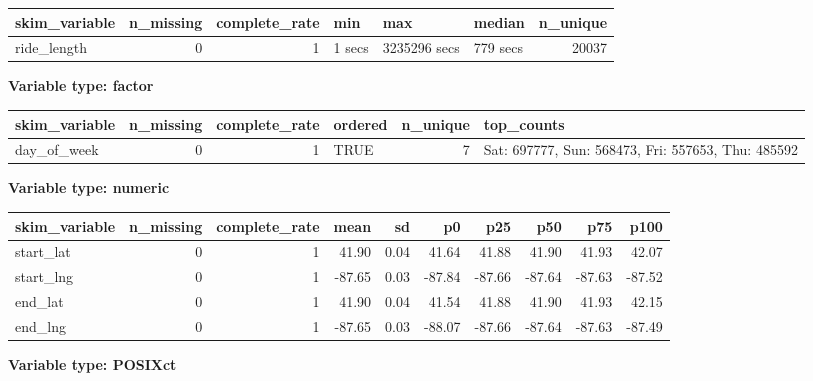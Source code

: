 \documentclass[
]{article}
\begin{document}
\begin{longtable}[]{@{}lrrlllr@{}}
\toprule
skim\_variable & n\_missing & complete\_rate & min & max & median &
n\_unique \\
\midrule
\endhead
ride\_length & 0 & 1 & 1 secs & 3235296 secs & 779 secs & 20037 \\
\bottomrule
\end{longtable}

\textbf{Variable type: factor}

\begin{longtable}[]{@{}lrrlrl@{}}
\toprule
skim\_variable & n\_missing & complete\_rate & ordered & n\_unique &
top\_counts \\
\midrule
\endhead
day\_of\_week & 0 & 1 & TRUE & 7 & Sat: 697777, Sun: 568473, Fri:
557653, Thu: 485592 \\
\bottomrule
\end{longtable}

\textbf{Variable type: numeric}

\begin{longtable}[]{@{}lrrrrrrrrr@{}}
\toprule
skim\_variable & n\_missing & complete\_rate & mean & sd & p0 & p25 &
p50 & p75 & p100 \\
\midrule
\endhead
start\_lat & 0 & 1 & 41.90 & 0.04 & 41.64 & 41.88 & 41.90 & 41.93 &
42.07 \\
start\_lng & 0 & 1 & -87.65 & 0.03 & -87.84 & -87.66 & -87.64 & -87.63 &
-87.52 \\
end\_lat & 0 & 1 & 41.90 & 0.04 & 41.54 & 41.88 & 41.90 & 41.93 &
42.15 \\
end\_lng & 0 & 1 & -87.65 & 0.03 & -88.07 & -87.66 & -87.64 & -87.63 &
-87.49 \\
\bottomrule
\end{longtable}

\textbf{Variable type: POSIXct}
\end{document}

